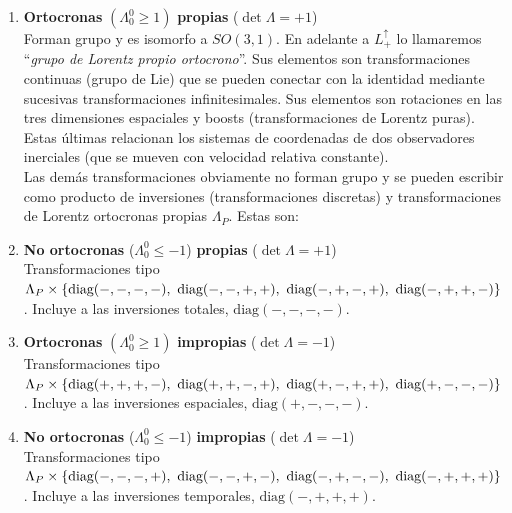\begin{enumerate}
    \item \textbf{Ortocronas} $(\Lambda^{0}_{0} \geq 1)$ \textbf{propias} ($\det \Lambda = + 1$)\\
    
    Forman grupo y es isomorfo a $SO(3,1)$. En adelante a $L_{+}^{\uparrow}$ lo llamaremos ``\emph{grupo de Lorentz propio ortocrono}''. Sus elementos son transformaciones continuas (grupo de Lie) que se pueden conectar con la identidad mediante sucesivas transformaciones infinitesimales. Sus elementos son rotaciones en las tres dimensiones espaciales y boosts (transformaciones de Lorentz puras). Estas últimas relacionan los sistemas de coordenadas de dos observadores inerciales (que se mueven con velocidad relativa constante).\\

    Las demás transformaciones obviamente no forman grupo y se pueden escribir como producto de inversiones (transformaciones discretas) y transformaciones de Lorentz ortocronas propias $\Lambda_{P}$. Estas son:
    \vspace{1cm}
    \item \textbf{No ortocronas} ($\Lambda^{0}_{0} \leq -1$) \textbf{propias} ($\det \Lambda = + 1$)   \\

    Transformaciones tipo $\Lambda_{P} \times \qty{\text{diag} \qty(-,-,-,-),~ \text{diag} \qty(-,-,+,+),~ \text{diag} \qty(-,+,-,+),~ \text{diag} \qty(-,+,+,-)}$. Incluye a las inversiones totales, $\text{diag} (-,-,-,-)$.
   \vspace{1cm} 
   \item  \textbf{Ortocronas} $(\Lambda^{0}_{0} \geq 1)$ \textbf{impropias} ($\det \Lambda = - 1$)\\

   Transformaciones tipo $\Lambda_{P} \times \qty{\text{diag} \qty(+,+,+,-),~ \text{diag} \qty(+,+,-,+),~ \text{diag} \qty(+,-,+,+),~ \text{diag} \qty(+,-,-,-)}$. Incluye a las inversiones espaciales, $\text{diag} (+,-,-,-)$.
   \vspace{1cm} 
   \item \textbf{No ortocronas} ($\Lambda^{0}_{0} \leq -1$) \textbf{impropias} ($\det \Lambda = - 1$)   \\
   Transformaciones tipo $\Lambda_{P} \times \qty{\text{diag} \qty(-,-,-,+),~ \text{diag} \qty(-,-,+,-),~ \text{diag} \qty(-,+,-,-),~ \text{diag} \qty(-,+,+,+)}$. Incluye a las inversiones temporales, $\text{diag} (-,+,+,+)$.
\end{enumerate}


